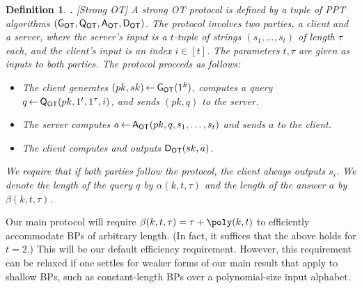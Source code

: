 \documentclass[11pt]{article}
\newcommand{\genot}{{\sf G_{OT}}}
\newcommand{\queot}{{\sf Q_{OT}}}
\newcommand{\ansot}{{\sf A_{OT}}}
\newcommand{\decot}{{\sf D_{OT}}}
\newcommand{\otl}{{\tau}}
\newtheorem{DEFINITION}{Definition}[section]
\newenvironment{definition}{\begin{DEFINITION} \hspace{-.85em} {\bf .} \rm}%
	{\end{DEFINITION}}
\newcommand{\from}{{\,\leftarrow\,}}
\newcommand{\samp}[2]{#1\from #2}
\begin{document}
\begin{definition}[Strong OT]
\label{def-ot} A {\em strong OT} protocol is defined by a tuple of
PPT algorithms $(\genot,\queot,\ansot,\decot)$. The protocol
involves two parties, a client and a server, where the server's
input is a $t$-tuple of strings $(s_1,\ldots,s_t)$ of length $\otl$
each, and the client's input is an index $i\in[t]$. The parameters
$t,\otl$ are given as inputs to both parties. The protocol proceeds
as follows:
\begin{itemize}
\item The client generates $\samp{(pk,sk)}{\genot(1^k)}$, computes a
query $\samp{q}{\queot(pk,1^t,1^\otl,i)}$, and sends $(pk,q)$ to the
server.
\item  The server computes $\samp{a}{\ansot(pk,q,s_1,\ldots,s_t)}$
and sends $a$ to the client.
\item  The client computes and outputs $\decot(sk,a)$.
\end{itemize}
We require that if both parties follow the protocol, the client
always outputs $s_i$. We denote the length of the query $q$ by
$\alpha(k,t,\otl)$ and the length of the answer $a$ by
$\beta(k,t,\otl)$.
\end{definition}
Our main protocol will require $\beta(k,t,\otl)=\otl+\poly(k,t)$ to
efficiently accommodate BPs of arbitrary length. (In fact, it
suffices that the above holds for $t=2$.) This will be our default
efficiency requirement. However, this requirement can be relaxed if
one settles for weaker forms of our main result that apply to
shallow BPs, such as constant-length BPs over a polynomial-size
input alphabet.
\end{document}

